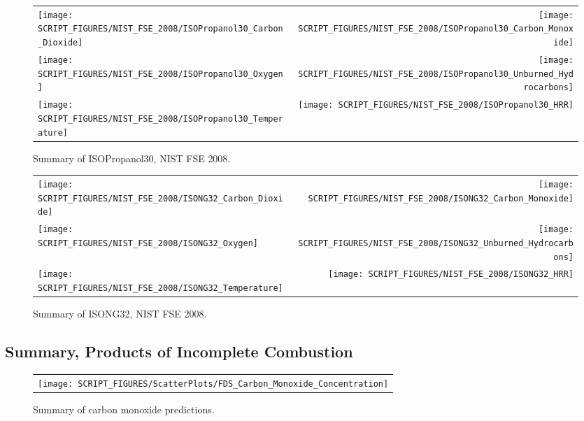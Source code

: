 \begin{figure}[p]
\begin{tabular*}{\textwidth}{l@{\extracolsep{\fill}}r}
\texttt{[image: SCRIPT\_FIGURES/NIST\_FSE\_2008/ISOPropanol30\_Carbon\_Dioxide]} &
\texttt{[image: SCRIPT\_FIGURES/NIST\_FSE\_2008/ISOPropanol30\_Carbon\_Monoxide]} \\
\texttt{[image: SCRIPT\_FIGURES/NIST\_FSE\_2008/ISOPropanol30\_Oxygen]} &
\texttt{[image: SCRIPT\_FIGURES/NIST\_FSE\_2008/ISOPropanol30\_Unburned\_Hydrocarbons]} \\
\texttt{[image: SCRIPT\_FIGURES/NIST\_FSE\_2008/ISOPropanol30\_Temperature]} &
\texttt{[image: SCRIPT\_FIGURES/NIST\_FSE\_2008/ISOPropanol30\_HRR]}
\end{tabular*}
\caption[Summary of ISOPropanol30, NIST FSE 2008]{Summary of ISOPropanol30, NIST FSE 2008.}
\label{NIST_FSE_1994_ISOPropanol30}
\end{figure}

\begin{figure}[p]
\begin{tabular*}{\textwidth}{l@{\extracolsep{\fill}}r}
\texttt{[image: SCRIPT\_FIGURES/NIST\_FSE\_2008/ISONG32\_Carbon\_Dioxide]} &
\texttt{[image: SCRIPT\_FIGURES/NIST\_FSE\_2008/ISONG32\_Carbon\_Monoxide]} \\
\texttt{[image: SCRIPT\_FIGURES/NIST\_FSE\_2008/ISONG32\_Oxygen]} &
\texttt{[image: SCRIPT\_FIGURES/NIST\_FSE\_2008/ISONG32\_Unburned\_Hydrocarbons]} \\
\texttt{[image: SCRIPT\_FIGURES/NIST\_FSE\_2008/ISONG32\_Temperature]} &
\texttt{[image: SCRIPT\_FIGURES/NIST\_FSE\_2008/ISONG32\_HRR]}
\end{tabular*}
\caption[Summary of ISONG32, NIST FSE 2008]{Summary of ISONG32, NIST FSE 2008.}
\label{NIST_FSE_1994_ISONG32}
\end{figure}

\clearpage

\subsection{Summary, Products of Incomplete Combustion}
\label{Carbon Monoxide Concentration}

\begin{figure}[h]
\begin{center}
\begin{tabular}{c}
\texttt{[image: SCRIPT\_FIGURES/ScatterPlots/FDS\_Carbon\_Monoxide\_Concentration]}
\end{tabular}
\end{center}
\caption[Summary of carbon monoxide predictions]{Summary of carbon monoxide predictions.}
\label{Summary_CO_Concentration}
\end{figure}

